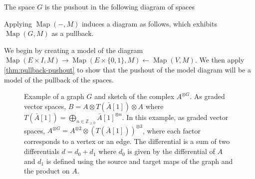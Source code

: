 \documentclass{scrartcl}
\theoremstyle{plain}
\theoremstyle{definition}
\newcommand{\Z}{\mathbb Z}
\newcommand{\from}{\leftarrow}
\DeclareMathOperator{\Map}{Map}
\renewcommand{\coprod}{\mathbin{\amalg}}
\newcommand{\blank}{-}
\begin{document}
The space $G$ is the pushout in the following diagram of spaces
\begin{center}
\end{center}
Applying $\Map(\blank, M)$ induces a diagram as follows, which exhibits $\Map(G, M)$ as a pullback. 
\begin{center}\label{diag:mapping-space-pullback}
\end{center}
We begin by creating a model of the diagram $\Map(E\times I, M) \to \Map(E\times \{0, 1\}, M)  \from \Map(V, M)$. We then apply \cref{thm:pullback-pushout} to show that the pushout of the model diagram will be a model of the pullback of the spaces. 


\begin{figure}[h]
    \center
    \caption{Example of a graph $G$ and sketch of the complex $A^{\otimes G}$. As graded vector spaces, $B = A\otimes T(\bar A[1])\otimes A$ where $T(\bar A[1]) = \bigoplus_{n\in \Z_{\geq 0}} \bar A[1]^{\otimes n}$. In this example, as graded vector spaces, $A^{\otimes G} = A^{\otimes 2} \otimes (T(\bar A[1]))^{\otimes 3}$, where each factor corresponds to a vertex or an edge. The differential is a sum of two differentials $d=d_0+d_1$ where $d_0$ is given by the differential of $A$ and $d_1$ is defined using the source and target maps of the graph and the product on $A$. }\label{fig:graph-model-example}
\end{figure}
\end{document}
